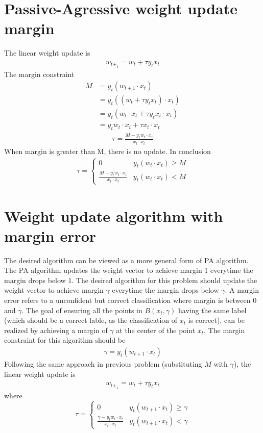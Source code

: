 \documentclass[12pt]{article}
\begin{document}
\section{Passive-Agressive weight update margin}
The linear weight update is
\begin{align}
  w_{t+_1} = w_{t} + \tau y_{t} x_{t}
\end{align}
The margin constraint
\begin{align}
  M
  &= y_{t} (w_{t+1} \cdot x_{t})\\
  &= y_{t} ((w_{t} + \tau y_{t} x_{t}) \cdot x_{t})\\
  &= y_{t} (w_{t} \cdot x_{t} + \tau y_{t} x_{t} \cdot x_{t})\\
  &= y_{t} w_{t} \cdot x_{t} + \tau x_{t} \cdot x_{t}
\end{align}
\begin{align}
  \tau = \frac{M - y_{t} w_{t} \cdot x_{t}}{ x_{t} \cdot x_{t}}
\end{align}
When margin is greater than M, there is no update. In conclusion
\begin{align}
  \tau =
  \begin{cases}
      0 & y_{t} (w_t \cdot x_{t}) \geq M \\
      \frac{M - y_{t} w_{t} \cdot x_{t}}{ x_{t} \cdot x_{t}} & y_{t} (w_t \cdot x_{t}) < M
  \end{cases}
\end{align}

\section{Weight update algorithm with margin error}
The desired algorithm can be viewed as a more general form of PA algorithm. The PA algorithm updates the weight vector to achieve margin 1 everytime the margin drops below 1. The desired algorithm for this problem should update the weight vector to achieve margin $\gamma$ everytime the margin drops below $\gamma$. A margin error refers to a unconfident but correct classification where margin is between 0 and $\gamma$. The goal of ensuring all the points in $B(x_{t},\gamma)$ having the same label (which should be a correct lable, as the classification of $x_{t}$ is correct), can be realized by achieving a margin of $\gamma$ at the center of the point $x_{t}$. The margin constraint for this algorithm should be
\begin{align}
  \gamma = y_{t} (w_{t+1} \cdot x_{t})
\end{align}
Following the same approach in previous problem (substituting $M$ with $\gamma $), the linear weight update is
\begin{align}
  w_{t+_1} = w_{t} + \tau y_{t} x_{t}
\end{align}
where
\begin{equation}
  \tau =
  \begin{cases}
      0 & y_{t} (w_{t+1} \cdot x_{t}) \geq \gamma  \\
      \frac{\gamma  - y_{t} w_{t} \cdot x_{t}}{ x_{t} \cdot x_{t}} & y_{t} (w_{t+1} \cdot x_{t}) < \gamma 
  \end{cases}
\end{equation}
\end{document}
